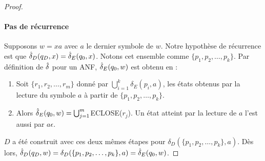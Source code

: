 \begin{proof}
	\paragraph{Pas de récurrence} Supposons $w=xa$ avec $a$ le dernier symbole de $w$. Notre hypothèse de récurrence est que $\hat{\delta}_D(q_D,x)=\hat{\delta}_E(q_0,x)$. Notons cet ensemble comme $\{p_1,p_2, \dots, p_k\}$. Par définition de $\hat{\delta}$ pour un ANF, $\hat{\delta}_E(q_0,w)$ est obtenu en :
	
	\begin{enumerate}
		\item Soit $\{r_1,r_2,\dots, r_m\}$ donné par $\bigcup_{i=1}^k \delta_E(p_i,a)$, les états obtenus par la lecture du symbole $a$ à partir de $\{p_1,p_2,\dots,p_k\}$.
		\item Alors $\hat{\delta}_E(q_0,w)=\bigcup_{j=1}^m$ECLOSE($r_j$). Un état atteint par la lecture de $a$ l'est aussi par $a\epsilon$.
	\end{enumerate}
	
	$D$ a été construit avec ces deux mêmes étapes pour $\delta_D(\{p_1,p_2,\dots, p_k\},a)$. Dès lors, $\hat{\delta}_D(q_D,w)=\delta_D(\{p_1,p_2,\dots, p_k\},a)=\hat{\delta}_E(q_0,w)$.	
	
\end{proof}


